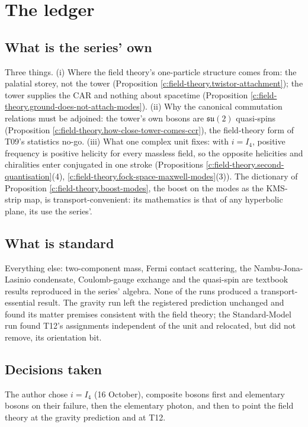 \documentclass[11pt]{article}
\theoremstyle{definition}
\theoremstyle{plain}
\begin{document}
\section{The ledger}

\subsection*{What is the series' own}
\label{c:note.field-theory.setting-what-series-own}
Three things. (i) Where the field theory's one-particle structure comes from: the palatial storey, not the tower (Proposition \ref{c:field-theory.twistor-attachment}); the tower supplies the CAR and nothing about spacetime (Proposition \ref{c:field-theory.ground-does-not-attach-modes}). (ii) Why the canonical commutation relations must be adjoined: the tower's own bosons are $\mathfrak{su}(2)$ quasi-spins (Proposition \ref{c:field-theory.how-close-tower-comes-ccr}), the field-theory form of T09's statistics no-go. (iii) What one complex unit fixes: with $i = I_4$, positive frequency is positive helicity for every massless field, so the opposite helicities and chiralities enter conjugated in one stroke (Propositions \ref{c:field-theory.second-quantisation}(4), \ref{c:field-theory.fock-space-maxwell-modes}(3)). The dictionary of Proposition \ref{c:field-theory.boost-modes}, the boost on the modes as the KMS-strip map, is transport-convenient: its mathematics is that of any hyperbolic plane, its use the series'.

\subsection*{What is standard}
\label{c:note.field-theory.setting-what-standard}
Everything else: two-component mass, Fermi contact scattering, the Nambu-Jona-Lasinio condensate, Coulomb-gauge exchange and the quasi-spin are textbook results reproduced in the series' algebra. None of the runs produced a transport-essential result. The gravity run left the registered prediction unchanged and found its matter premises consistent with the field theory; the Standard-Model run found T12's assignments independent of the unit and relocated, but did not remove, its orientation bit.

\subsection*{Decisions taken}
\label{c:note.field-theory.setting-decisions-taken}
The author chose $i = I_4$ (16 October), composite bosons first and elementary bosons on their failure, then the elementary photon, and then to point the field theory at the gravity prediction and at T12.
\end{document}
